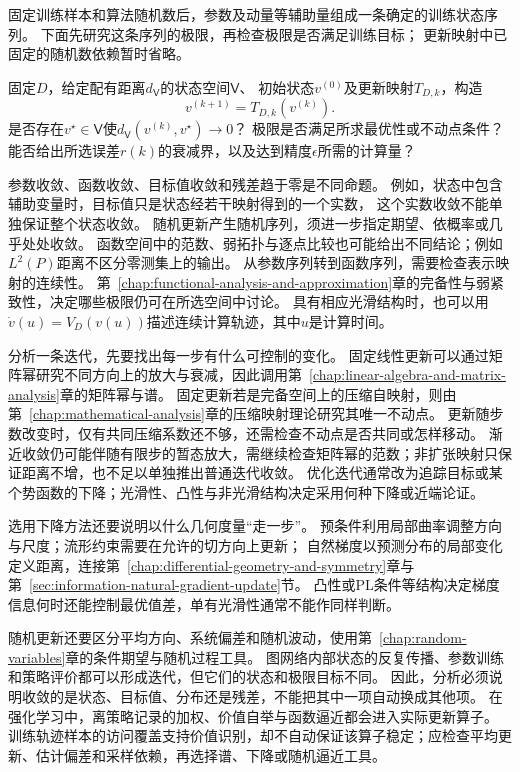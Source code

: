 固定训练样本和算法随机数后，参数及动量等辅助量组成一条确定的训练状态序列。
下面先研究这条序列的极限，再检查极限是否满足训练目标；
更新映射中已固定的随机数依赖暂时省略。

\begin{mathproblem}[训练序列的极限与速度]
  \label{question:future-convergence}
  固定$D$，给定配有距离$d_{\mathsf V}$的状态空间$\mathsf V$、
  初始状态$v^{(0)}$及更新映射$T_{D,k}$，构造
  \[
    v^{(k+1)}=T_{D,k}(v^{(k)}).
  \]
  是否存在$v^\star\in\mathsf V$使$d_{\mathsf V}(v^{(k)},v^\star)\to0$？
  极限是否满足所求最优性或不动点条件？
  能否给出所选误差$r(k)$的衰减界，以及达到精度$\epsilon$所需的计算量？
\end{mathproblem}

参数收敛、函数收敛、目标值收敛和残差趋于零是不同命题。
例如，状态中包含辅助变量时，目标值只是状态经若干映射得到的一个实数，
这个实数收敛不能单独保证整个状态收敛。
随机更新产生随机序列，须进一步指定期望、依概率或几乎处处收敛。
函数空间中的范数、弱拓扑与逐点比较也可能给出不同结论；例如$L^2(P)$距离不区分零测集上的输出。
从参数序列转到函数序列，需要检查表示映射的连续性。
第~\ref{chap:functional-analysis-and-approximation}章的完备性与弱紧致性，决定哪些极限仍可在所选空间中讨论。
具有相应光滑结构时，也可以用$\dot v(u)=V_D(v(u))$描述连续计算轨迹，其中$u$是计算时间。

分析一条迭代，先要找出每一步有什么可控制的变化。
固定线性更新可以通过矩阵幂研究不同方向上的放大与衰减，因此调用第~\ref{chap:linear-algebra-and-matrix-analysis}章的矩阵幂与谱。
固定更新若是完备空间上的压缩自映射，则由第~\ref{chap:mathematical-analysis}章的压缩映射理论研究其唯一不动点。
更新随步数改变时，仅有共同压缩系数还不够，还需检查不动点是否共同或怎样移动。
渐近收敛仍可能伴随有限步的暂态放大，需继续检查矩阵幂的范数；非扩张映射只保证距离不增，也不足以单独推出普通迭代收敛。
优化迭代通常改为追踪目标或某个势函数的下降；光滑性、凸性与非光滑结构决定采用何种下降或近端论证。

选用下降方法还要说明以什么几何度量“走一步”。
预条件利用局部曲率调整方向与尺度；流形约束需要在允许的切方向上更新；
自然梯度以预测分布的局部变化定义距离，连接第~\ref{chap:differential-geometry-and-symmetry}章与第~\ref{sec:information-natural-gradient-update}节。
凸性或PL条件等结构决定梯度信息何时还能控制最优值差，单有光滑性通常不能作同样判断。

随机更新还要区分平均方向、系统偏差和随机波动，使用第~\ref{chap:random-variables}章的条件期望与随机过程工具。
图网络内部状态的反复传播、参数训练和策略评价都可以形成迭代，但它们的状态和极限目标不同。
因此，分析必须说明收敛的是状态、目标值、分布还是残差，不能把其中一项自动换成其他项。
在强化学习中，离策略记录的加权、价值自举与函数逼近都会进入实际更新算子。
训练轨迹样本的访问覆盖支持价值识别，却不自动保证该算子稳定；应检查平均更新、估计偏差和采样依赖，再选择谱、下降或随机逼近工具。

